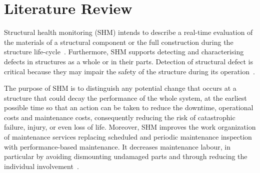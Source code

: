 \chapter[Literature Review]{Literature Review}
\label{ch2}
Structural health monitoring (SHM) intends to describe a real-time evaluation 
of the materials of a structural component or the full construction during the structure life-cycle~\cite{Balageas2010}. 
Furthermore, SHM supports detecting and characterising defects in structures 
as a whole or in their parts.
Detection of structural defect is critical because they may impair the safety of the structure during its operation~\cite{Yuan2016}. 

The purpose of SHM is to distinguish any potential change that occurs at 
a structure that could decay the performance of the whole system, at the 
earliest possible time so that an action can be taken to reduce the downtime, 
operational costs and maintenance costs, consequently reducing the risk of 
catastrophic failure, injury, or even loss of life.
Moreover, SHM improves the work organization of maintenance services replacing scheduled and periodic maintenance inspection with performance-based maintenance.
It decreases maintenance labour, in particular by avoiding dismounting undamaged parts and through reducing the individual involvement~\cite{Balageas2010}.

